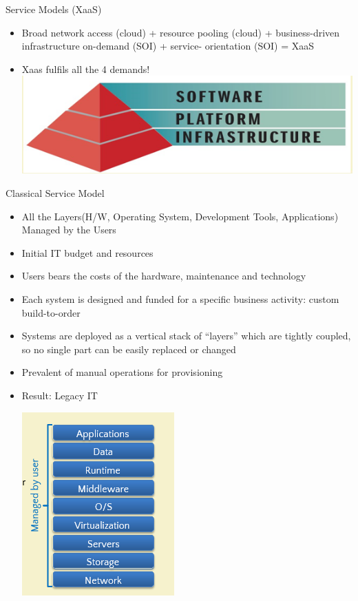 \documentclass{SKP-beamer}
\begin{document}
\begin{frame}{Service Models (XaaS)}
	\begin{itemize}
		\item Broad network access (cloud) + resource pooling (cloud) + business-driven infrastructure on-demand (SOI) + service- orientation (SOI) = XaaS
		\item Xaas fulfils all the 4 demands!
		\includegraphics[scale=0.7]{m.png}
	\end{itemize}
\end{frame}

\begin{frame}{Classical Service Model}
	\begin{itemize}
		\item All the Layers(H/W, Operating System, Development Tools, Applications) Managed by the Users
    	\item Initial IT budget and resources
    	\item Users bears the costs of the hardware, maintenance and technology
    	\item Each system is designed and funded for a specific business activity: custom build-to-order
    	\item Systems are deployed as a vertical stack of “layers” which are tightly coupled, so no single part can be easily replaced or changed
    	\item Prevalent of manual operations for provisioning
    	\item Result: Legacy IT
    	
    	
		\includegraphics[scale=0.7]{n.png}
	\end{itemize}
\end{frame}
\end{document}
